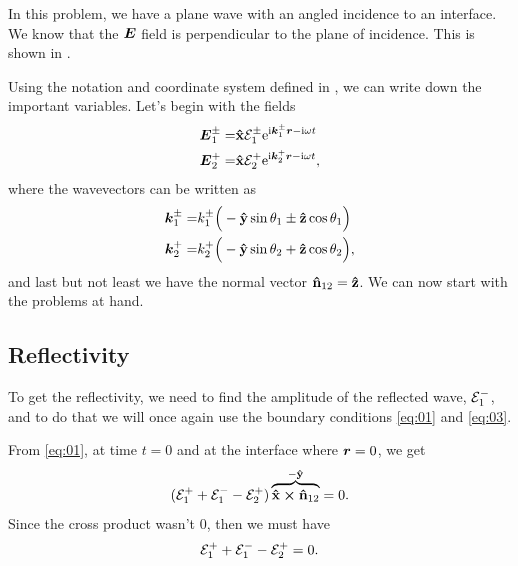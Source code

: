 \documentclass[11pt,letter, swedish, english
]{article}
\begin{document}
In this problem, we have a plane wave with an angled incidence to an
interface. We know that the $\vb*E$ field is perpendicular to the
plane of incidence. This is shown in .

Using the notation and coordinate system defined in
, we can write down the important variables. 
Let's begin with the fields
\begin{equation}
\begin{aligned}
\vb*E_1^\pm=&\vu{x}\mathcal{E}_1^\pm\mathrm{e}^{\mathrm{i} \vb*k_1^\pm\vb*r -\mathrm{i}\omega t}\\
\vb*E_2^+=&\vu{x}\mathcal{E}_2^+\mathrm{e}^{\mathrm{i} \vb*{k}_2^+\vb*r -\mathrm{i}\omega t},
\end{aligned}
\end{equation}
where the wavevectors can be written as
\begin{equation}
\begin{aligned}
\vb*k_1^\pm =& k_1^\pm\Big(-\vu{y}\sin\theta_1 \pm \vu{z}\cos\theta_1\Big)\\
\vb*{k}_2^+       =& k_2^+ \Big(-\vu{y}\sin\theta_2 + \vu{z}\cos\theta_2\Big),
\end{aligned}
\end{equation}
and last but not least we have the normal vector $\vu{n}_{12}=\vu{z}$.
We can now start with the problems at hand.



\subsection{Reflectivity}
To get the reflectivity, we need to find the amplitude of the
reflected wave, ${\mathcal{E}_1^-}$, and to do that we will once again use the
boundary conditions \eqref{eq:01} and \eqref{eq:03}. 

From \eqref{eq:01}, at time $t=0$ and at the interface where
$\vb*r=0$\footnotemark{}, we get 
\begin{equation}
({\mathcal{E}_1^+} + {\mathcal{E}_1^-} - {\mathcal{E}_2^+})
\overbrace{\vu{x}\cross\vu{n}_{12}}^{-\vu{y}} =0.
\end{equation}
Since the cross product wasn't 0, then we must have
\begin{equation}\label{eq:3a_BC1}
{\mathcal{E}_1^+} + {\mathcal{E}_1^-} - {\mathcal{E}_2^+} =0.
\end{equation}
\end{document}
